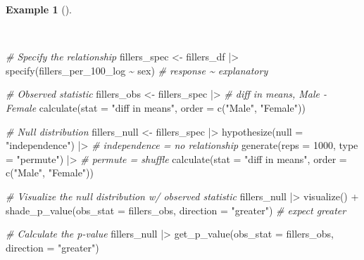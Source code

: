 \documentclass[
  letterpaper,
  DIV=11,
  numbers=noendperiod]{scrreprt}
\newenvironment{Shaded}{\begin{snugshade}}{\end{snugshade}}
\newcommand{\AttributeTok}[1]{\textcolor[rgb]{0.00,0.00,0.00}{#1}}
\newcommand{\CommentTok}[1]{\textcolor[rgb]{0.00,0.00,0.00}{\textit{#1}}}
\newcommand{\DecValTok}[1]{\textcolor[rgb]{0.00,0.00,0.00}{#1}}
\newcommand{\FunctionTok}[1]{\textcolor[rgb]{0.00,0.00,0.00}{#1}}
\newcommand{\NormalTok}[1]{\textcolor[rgb]{0.00,0.00,0.00}{#1}}
\newcommand{\OtherTok}[1]{\textcolor[rgb]{0.00,0.00,0.00}{#1}}
\newcommand{\SpecialCharTok}[1]{\textcolor[rgb]{0.00,0.00,0.00}{#1}}
\newcommand{\StringTok}[1]{\textcolor[rgb]{0.00,0.00,0.00}{#1}}
\theoremstyle{definition}
\newtheorem{example}{Example}[chapter]
\theoremstyle{remark}
\begin{document}
\begin{example}[]\protect\hypertarget{exm-ida-num-bi-sex-null}{}\label{exm-ida-num-bi-sex-null}

~

\begin{Shaded}
\begin{Highlighting}[]
\CommentTok{\# Specify the relationship}
\NormalTok{fillers\_spec }\OtherTok{\textless{}{-}}
\NormalTok{  fillers\_df }\SpecialCharTok{|\textgreater{}}
  \FunctionTok{specify}\NormalTok{(fillers\_per\_100\_log }\SpecialCharTok{\textasciitilde{}}\NormalTok{ sex) }\CommentTok{\# response \textasciitilde{} explanatory}

\CommentTok{\# Observed statistic}
\NormalTok{fillers\_obs }\OtherTok{\textless{}{-}}
\NormalTok{  fillers\_spec }\SpecialCharTok{|\textgreater{}}
  \CommentTok{\# diff in means, Male {-} Female}
  \FunctionTok{calculate}\NormalTok{(}\AttributeTok{stat =} \StringTok{"diff in means"}\NormalTok{, }\AttributeTok{order =} \FunctionTok{c}\NormalTok{(}\StringTok{"Male"}\NormalTok{, }\StringTok{"Female"}\NormalTok{))}

\CommentTok{\# Null distribution}
\NormalTok{fillers\_null }\OtherTok{\textless{}{-}}
\NormalTok{  fillers\_spec }\SpecialCharTok{|\textgreater{}}
  \FunctionTok{hypothesize}\NormalTok{(}\AttributeTok{null =} \StringTok{"independence"}\NormalTok{) }\SpecialCharTok{|\textgreater{}} \CommentTok{\# independence = no relationship}
  \FunctionTok{generate}\NormalTok{(}\AttributeTok{reps =} \DecValTok{1000}\NormalTok{, }\AttributeTok{type =} \StringTok{"permute"}\NormalTok{) }\SpecialCharTok{|\textgreater{}} \CommentTok{\# permute = shuffle}
  \FunctionTok{calculate}\NormalTok{(}\AttributeTok{stat =} \StringTok{"diff in means"}\NormalTok{, }\AttributeTok{order =} \FunctionTok{c}\NormalTok{(}\StringTok{"Male"}\NormalTok{, }\StringTok{"Female"}\NormalTok{))}

\CommentTok{\# Visualize the null distribution w/ observed statistic}
\NormalTok{fillers\_null }\SpecialCharTok{|\textgreater{}}
  \FunctionTok{visualize}\NormalTok{() }\SpecialCharTok{+}
  \FunctionTok{shade\_p\_value}\NormalTok{(}\AttributeTok{obs\_stat =}\NormalTok{ fillers\_obs, }\AttributeTok{direction =} \StringTok{"greater"}\NormalTok{) }\CommentTok{\# expect greater}

\CommentTok{\# Calculate the p{-}value}
\NormalTok{fillers\_null }\SpecialCharTok{|\textgreater{}}
  \FunctionTok{get\_p\_value}\NormalTok{(}\AttributeTok{obs\_stat =}\NormalTok{ fillers\_obs, }\AttributeTok{direction =} \StringTok{"greater"}\NormalTok{)}
\end{Highlighting}
\end{Shaded}


\end{example}
\end{document}
